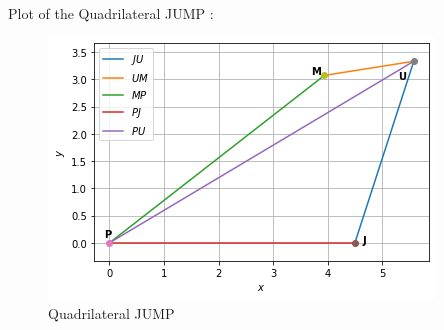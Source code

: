 \documentclass[journal,12pt,twocolumn]{IEEEtran}
\begin{document}
\begin{enumerate}
\begin{align}
\end{align}
Plot of the Quadrilateral JUMP :
\begin{figure}[!ht]
    \centering
    \includegraphics[width=\columnwidth]{JUMP fig.png}
    \caption{Quadrilateral JUMP}
    \label{fig:Quadrilateral JUMP}
\end{figure}
\end{enumerate}
\end{document}
